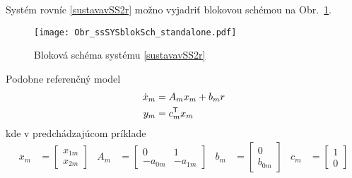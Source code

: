 \documentclass[a4paper, 10pt, ]{article}
\begin{document}
Systém rovníc \eqref{sustavavSS2r} možno vyjadriť blokovou schémou na Obr.~\ref{orsvsp:fig:01}.







\begin{figure}[t]
    \centering
    \texttt{[image: Obr\_ssSYSblokSch\_standalone.pdf]}


    \caption{Bloková schéma systému \eqref{sustavavSS2r}}
    \label{orsvsp:fig:01}


\end{figure}










Podobne referenčný model
\begin{subequations}
    \begin{align}
         \dot x_m &= A_m x_m + b_m r \\
         y_m &= c_m^{\mathsf{T}} x_m
    \end{align}
\end{subequations}
kde v predchádzajúcom príklade
\begin{align*}
    x_m &= \begin{bmatrix} x_{1m} \\ x_{2m} \end{bmatrix}
    &
    A_m &= \begin{bmatrix} 0 & 1 \\ -a_{0m} & -a_{1m} \end{bmatrix}
    &
    b_m &= \begin{bmatrix} 0 \\ b_{0m} \end{bmatrix}
    &
    c_m &= \begin{bmatrix} 1 \\ 0 \end{bmatrix}
\end{align*}
\end{document}
